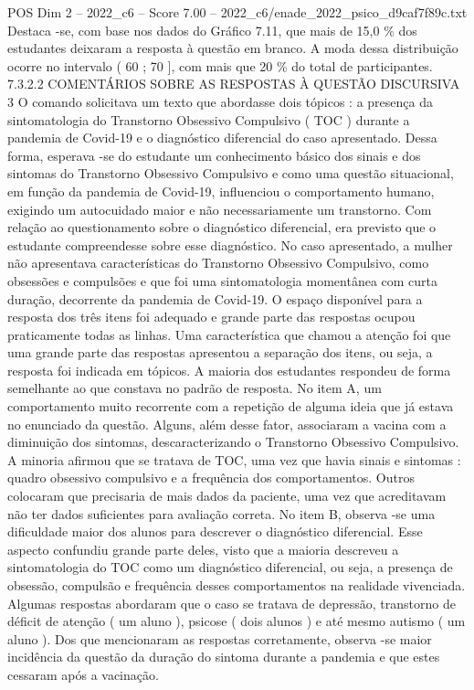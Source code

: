 \begin{textsample}{POS Dim 2 – 2022\_c6 – Score 7.00 – 2022\_c6/enade\_2022\_psico\_d9caf7f89c.txt}
Destaca -se, com base nos dados do Gráfico 7.11, que mais de 15,0 \% dos estudantes deixaram a resposta à questão em branco.
A moda dessa distribuição ocorre no intervalo ( 60 ; 70 ], com mais que 20 \% do total de participantes. 7.3.2.2 COMENTÁRIOS SOBRE AS RESPOSTAS À QUESTÃO DISCURSIVA 3 O comando solicitava um texto que abordasse dois tópicos : a presença da sintomatologia do Transtorno Obsessivo Compulsivo ( TOC ) durante a pandemia de Covid-19 e o diagnóstico diferencial do caso apresentado.
Dessa forma, esperava -se do estudante um conhecimento básico dos sinais e dos sintomas do Transtorno Obsessivo Compulsivo e como uma questão situacional, em função da pandemia de Covid-19, influenciou o comportamento humano, exigindo um autocuidado maior e não necessariamente um transtorno.
Com relação ao questionamento sobre o diagnóstico diferencial, era previsto que o estudante compreendesse sobre esse diagnóstico.
No caso apresentado, a mulher não apresentava características do Transtorno Obsessivo Compulsivo, como obsessões e compulsões e que foi uma sintomatologia momentânea com curta duração, decorrente da pandemia de Covid-19.
O espaço disponível para a resposta dos três itens foi adequado e grande parte das respostas ocupou praticamente todas as linhas.
Uma característica que chamou a atenção foi que uma grande parte das respostas apresentou a separação dos itens, ou seja, a resposta foi indicada em tópicos.
A maioria dos estudantes respondeu de forma semelhante ao que constava no padrão de resposta.
No item A, um comportamento muito recorrente com a repetição de alguma ideia que já estava no enunciado da questão.
Alguns, além desse fator, associaram a vacina com a diminuição dos sintomas, descaracterizando o Transtorno Obsessivo Compulsivo.
A minoria afirmou que se tratava de TOC, uma vez que havia sinais e sintomas : quadro obsessivo compulsivo e a frequência dos comportamentos.
Outros colocaram que precisaria de mais dados da paciente, uma vez que acreditavam não ter dados suficientes para avaliação correta.
No item B, observa -se uma dificuldade maior dos alunos para descrever o diagnóstico diferencial.
Esse aspecto confundiu grande parte deles, visto que a maioria descreveu a sintomatologia do TOC como um diagnóstico diferencial, ou seja, a presença de obsessão, compulsão e frequência desses comportamentos na realidade vivenciada.
Algumas respostas abordaram que o caso se tratava de depressão, transtorno de déficit de atenção ( um aluno ), psicose ( dois alunos ) e até mesmo autismo ( um aluno ).
Dos que mencionaram as respostas corretamente, observa -se maior incidência da questão da duração do sintoma durante a pandemia e que estes cessaram após a vacinação.

\end{textsample}
